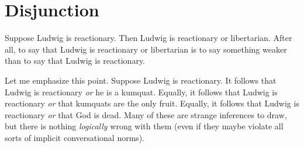 %
%

\section{Disjunction}
Suppose Ludwig is reactionary. Then Ludwig is reactionary or libertarian. After all, to say that Ludwig is reactionary or libertarian is to say something weaker than to say that Ludwig is reactionary. 

Let me emphasize this point. Suppose Ludwig is reactionary. It follows that Ludwig is reactionary \emph{or} he is a kumquat. Equally, it follows that Ludwig is reactionary \emph{or} that kumquats are the only fruit.  Equally, it follows that Ludwig is reactionary \emph{or} that God is dead. Many of these are strange inferences to draw, but there is nothing \emph{logically} wrong with them (even if they maybe violate all sorts of implicit conversational norms).

